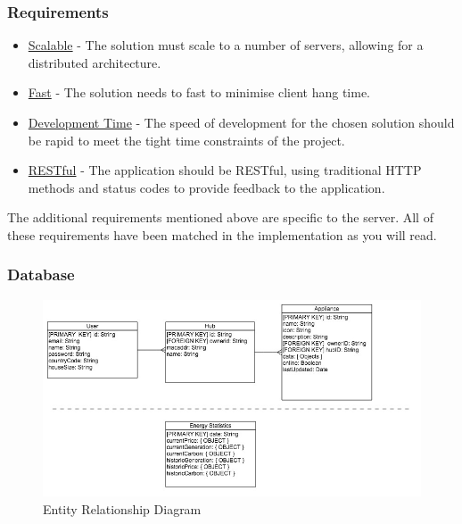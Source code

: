 \documentclass[preprint,12pt,3p]{elsarticle}
\begin{document}
\subsubsection{Requirements}
\begin{itemize}
\item \underline{Scalable} - The solution must scale to a number of servers, allowing for a distributed architecture.
\item \underline{Fast} - The solution needs to fast to minimise client hang time.
\item \underline{Development Time} - The speed of development for the chosen solution should be rapid to meet the tight time constraints of the project.
\item \underline{RESTful} - The application should be RESTful, using traditional HTTP methods and status codes to provide feedback to the application.
\end{itemize}
The additional requirements mentioned above are specific to the server. All of these requirements have been matched in the implementation as you will read.

\subsubsection{Database}
\begin{figure}[H]
    \centering
    \includegraphics[width=\columnwidth]{diagrams/erd}
    \caption {Entity Relationship Diagram}
\end{figure}
\end{document}
